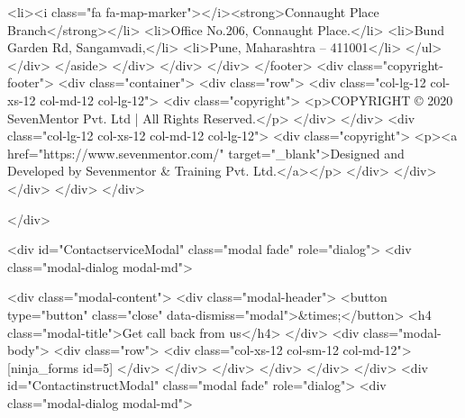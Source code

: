{<li><i class="fa fa-map-marker"></i><strong>Connaught Place Branch</strong></li>
<li>Office No.206, Connaught Place.</li>
<li>Bund Garden Rd, Sangamvadi,</li>
<li>Pune, Maharashtra – 411001</li>
</ul>
</div>
</aside> </div>
</div>
</div>
</footer>
<div class="copyright-footer">
<div class="container">
<div class="row">
<div class="col-lg-12 col-xs-12 col-md-12 col-lg-12">
<div class="copyright">
<p>COPYRIGHT © 2020 SevenMentor Pvt. Ltd | All Rights Reserved.</p>
</div>
</div>
<div class="col-lg-12 col-xs-12 col-md-12 col-lg-12">
<div class="copyright">
<p><a href="https://www.sevenmentor.com/" target="_blank">Designed and Developed by Sevenmentor & Training Pvt. Ltd.</a></p>
</div>
</div>
</div>
</div>
</div>

</div>

<div id="ContactserviceModal" class="modal fade" role="dialog">
<div class="modal-dialog modal-md">

<div class="modal-content">
<div class="modal-header">
<button type="button" class="close" data-dismiss="modal">&times;</button>
<h4 class="modal-title">Get call back from us</h4>
</div>
<div class="modal-body">
<div class="row">
<div class="col-xs-12 col-sm-12 col-md-12">
[ninja_forms id=5] </div>
</div>
</div>
</div>
</div>
</div>
<div id="ContactinstructModal" class="modal fade" role="dialog">
<div class="modal-dialog modal-md">

}
